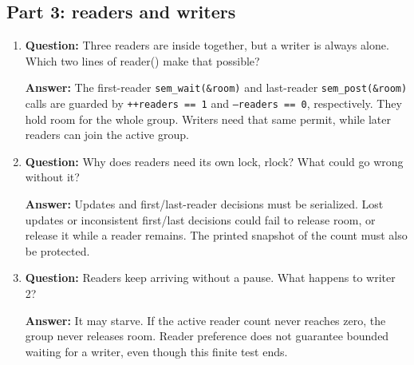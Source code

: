 \documentclass[12pt]{article}
\begin{document}
\subsection{Part 3: readers and writers}
\begin{enumerate}
\item \textbf{Question:} Three readers are inside together, but a writer is always alone. Which two lines of reader() make that possible?
\par\textbf{Answer:} The first-reader \texttt{sem\_wait(\&room)} and
last-reader \texttt{sem\_post(\&room)} calls are guarded by
\texttt{++readers == 1} and \texttt{--readers == 0}, respectively. They
hold room for the whole group. Writers need that same permit, while
later readers can join the active group.

\item \textbf{Question:} Why does readers need its own lock, rlock? What could go wrong without it?
\par\textbf{Answer:} Updates and first/last-reader decisions must be
serialized. Lost updates or inconsistent first/last decisions could
fail to release room, or release it while a reader remains. The printed
snapshot of the count must also be protected.

\item \textbf{Question:} Readers keep arriving without a pause. What happens to writer 2?
\par\textbf{Answer:} It may starve. If the active reader count never
reaches zero, the group never releases room. Reader preference does not
guarantee bounded waiting for a writer, even though this finite test ends.
\end{enumerate}
\end{document}
